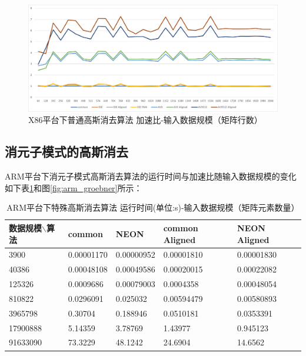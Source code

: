 \documentclass[a4paper]{article}
\begin{document}
\begin{figure}[H]
    \centering
    \includegraphics[width=6.2in]{fig/x86_gauss.png}
    \caption{X86平台下普通高斯消去算法 加速比-输入数据规模（矩阵行数）}
    \label{fig:x86_gauss}
\end{figure}

\subsection{消元子模式的高斯消去}

ARM平台下消元子模式高斯消去算法的运行时间与加速比随输入数据规模的变化如下表\ref{table:arm_groebner_timing}和图\ref{fig:arm_groebner}所示：

\begin{table}[H]
    \centering
    \begin{tabular}{|l|l|l|l|l|}
    \hline
        数据规模$\backslash$算法 & common & NEON & common Aligned & NEON Aligned \\ \hline
        3900 & 0.00001170 & 0.00000952 & 0.00001810 & 0.00001830 \\ \hline
        40386 & 0.00048108 & 0.00049586 & 0.00020015 & 0.00022082 \\ \hline
        125326 & 0.0009686 & 0.00079003 & 0.0004358 & 0.00048054 \\ \hline
        810822 & 0.0296091 & 0.025032 & 0.00594479 & 0.00580893 \\ \hline
        3965798 & 0.30704 & 0.188946 & 0.0510181 & 0.0353391 \\ \hline
        17900888 & 5.14359 & 3.78769 & 1.43977 & 0.945123 \\ \hline
        91633090 & 73.3229 & 48.1242 & 24.6904 & 14.6562 \\ \hline
    \end{tabular}
    \caption{ARM平台下特殊高斯消去算法 运行时间(单位:s)-输入数据规模（矩阵元素数量）}
    \label{table:arm_groebner_timing}
\end{table}
\end{document}

